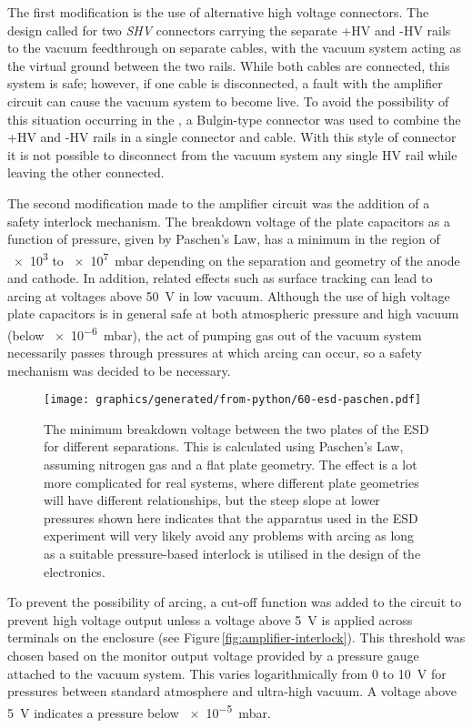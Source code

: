 The first modification is the use of alternative high voltage connectors. The \AEIPROTOTYPE{} design called for two \emph{SHV} connectors carrying the separate +\gls{HV} and -\gls{HV} rails to the vacuum feedthrough on separate cables, with the vacuum system acting as the virtual ground between the two rails. While both cables are connected, this system is safe; however, if one cable is disconnected, a fault with the amplifier circuit can cause the vacuum system to become live. To avoid the possibility of this situation occurring in the \SSM{}, a Bulgin-type connector was used to combine the +\gls{HV} and -\gls{HV} rails in a single connector and cable. With this style of connector it is not possible to disconnect from the vacuum system any single \gls{HV} rail while leaving the other connected.

The second modification made to the amplifier circuit was the addition of a safety interlock mechanism. The breakdown voltage of the plate capacitors as a function of pressure, given by Paschen's Law, has a minimum in the region of \SI{e3}{} to \SI{e7}{\milli\bar} depending on the separation and geometry of the anode and cathode. In addition, related effects such as surface tracking can lead to arcing at voltages above \SI{50}{\volt} in low vacuum. Although the use of high voltage plate capacitors is in general safe at both atmospheric pressure and high vacuum (below \SI{e-6}{\milli\bar}), the act of pumping gas out of the vacuum system necessarily passes through pressures at which arcing can occur, so a safety mechanism was decided to be necessary.

\begin{figure}
  \centering
  \texttt{[image: graphics/generated/from-python/60-esd-paschen.pdf]}
  \caption{The minimum breakdown voltage between the two plates of the \gls{ESD} for different separations. This is calculated using Paschen's Law, assuming nitrogen gas and a flat plate geometry. The effect is a lot more complicated for real systems, where different plate geometries will have different relationships, but the steep slope at lower pressures shown here indicates that the apparatus used in the \gls{ESD} experiment will very likely avoid any problems with arcing as long as a suitable pressure-based interlock is utilised in the design of the electronics.}
  \label{fig:esd-paschen}
\end{figure}

To prevent the possibility of arcing, a cut-off function was added to the circuit to prevent high voltage output unless a voltage above \SI{5}{\volt} is applied across terminals on the enclosure (see Figure\,\ref{fig:amplifier-interlock}). This threshold was chosen based on the monitor output voltage provided by a pressure gauge attached to the vacuum system. This varies logarithmically from \SI{0}{} to \SI{10}{\volt} for pressures between standard atmosphere and ultra-high vacuum. A voltage above \SI{5}{\volt} indicates a pressure below \SI{e-5}{\milli\bar}.

